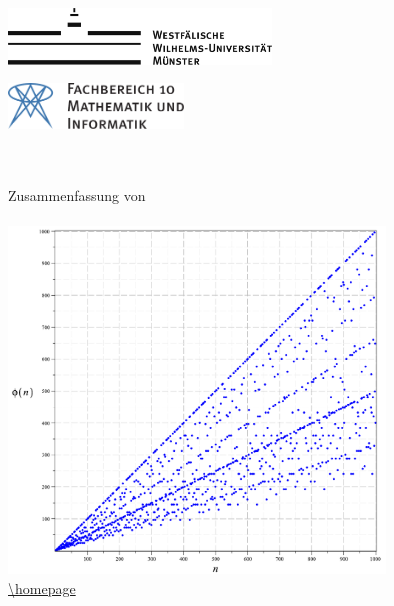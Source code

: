 \begin{titlepage}
\pagestyle{empty}
\begin{center}
\begin{minipage}{0.4\textwidth}
\begin{flushleft}
\includegraphics[height=1.5cm,keepaspectratio]{../!config/Bilder/wwulogo.pdf}
\end{flushleft}
\end{minipage}
\hfill
\begin{minipage}{0.4\textwidth}
\begin{flushright}
\vspace*{0.3cm}
\includegraphics[height=1.2cm,keepaspectratio]{../!config/Bilder/fb10logo.pdf} \
\end{flushright}
\end{minipage}

\vspace*{2cm}
\textbf{\Huge{\fach}} \\
\vspace{0.2cm} 
\textbf{{\LARGE \untertitel}} \\
\vspace{0.6cm}
\LARGE{Zusammenfassung von \verfasser} \\
\vspace{0.6cm}
\LARGE{\semester} \\
\vspace*{1.5cm}
\includegraphics[width=10cm,keepaspectratio]{content/totient.pdf} \\
\vspace*{1cm}
\footnotesize{\url{\homepage}} \\


\end{center}
\end{titlepage}

